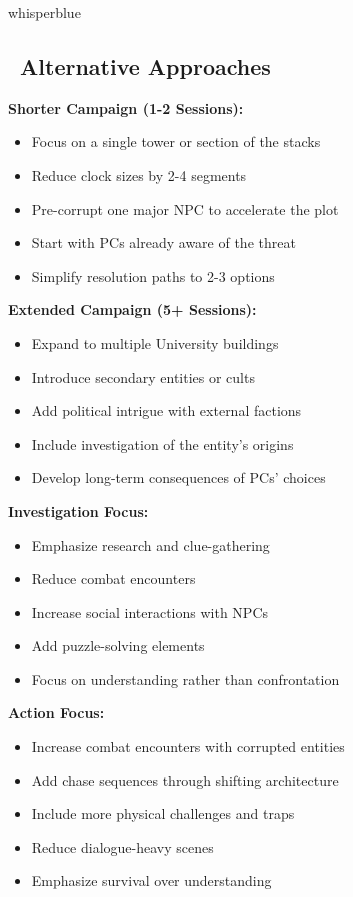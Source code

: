 \documentclass[11pt]{article}
\begin{document}
\begin{campaignsection}{whisperblue}
\subsection*{\faRandom\ Alternative Approaches}

\textbf{Shorter Campaign (1-2 Sessions):}
\begin{itemize}
    \item Focus on a single tower or section of the stacks
    \item Reduce clock sizes by 2-4 segments
    \item Pre-corrupt one major NPC to accelerate the plot
    \item Start with PCs already aware of the threat
    \item Simplify resolution paths to 2-3 options
\end{itemize}

\textbf{Extended Campaign (5+ Sessions):}
\begin{itemize}
    \item Expand to multiple University buildings
    \item Introduce secondary entities or cults
    \item Add political intrigue with external factions
    \item Include investigation of the entity's origins
    \item Develop long-term consequences of PCs' choices
\end{itemize}

\textbf{Investigation Focus:}
\begin{itemize}
    \item Emphasize research and clue-gathering
    \item Reduce combat encounters
    \item Increase social interactions with NPCs
    \item Add puzzle-solving elements
    \item Focus on understanding rather than confrontation
\end{itemize}

\textbf{Action Focus:}
\begin{itemize}
    \item Increase combat encounters with corrupted entities
    \item Add chase sequences through shifting architecture
    \item Include more physical challenges and traps
    \item Reduce dialogue-heavy scenes
    \item Emphasize survival over understanding
\end{itemize}


\end{campaignsection}
\end{document}
